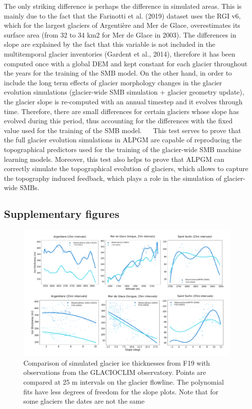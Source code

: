 The only striking difference is perhaps the difference in simulated areas. This is mainly due to the fact that the Farinotti et al. (2019) dataset uses the RGI v6, which for the largest glaciers of Argentière and Mer de Glace, overestimates its surface area (from 32 to 34 km2 for Mer de Glace in 2003). The differences in slope are explained by the fact that this variable is not included in the multitemporal glacier inventories (Gardent et al., 2014), therefore it has been computed once with a global DEM and kept constant for each glacier throughout the years for the training of the SMB model. On the other hand, in order to include the long term effects of glacier morphology changes in the glacier evolution simulations (glacier-wide SMB simulation + glacier geometry update), the glacier slope is re-computed with an annual timestep and it evolves through time. Therefore, there are small differences for certain glaciers whose slope has evolved during this period, thus accounting for the differences with the fixed value used for the training of the SMB model.
 
This test serves to prove that the full glacier evolution simulations in ALPGM are capable of reproducing the topographical predictors used for the training of the glacier-wide SMB machine learning models. Moreover, this test also helps to prove that ALPGM can correctly simulate the topographical evolution of glaciers, which allows to capture the topography induced feedback, which plays a role in the simulation of glacier-wide SMBs. 

\subsection{Supplementary figures}

\begin{figure}[h]
\centering
\includegraphics[width=15cm]{Figures/methods/Figure_S2.png}
\caption{Comparison of simulated glacier ice thicknesses from F19 with observations from the GLACIOCLIM observatory. Points are compared at 25 m intervals on the glacier flowline. The polynomial fits have less degrees of freedom for the slope plots. Note that for some glaciers the dates are not the same}
\label{methods:figS2}
\end{figure}

